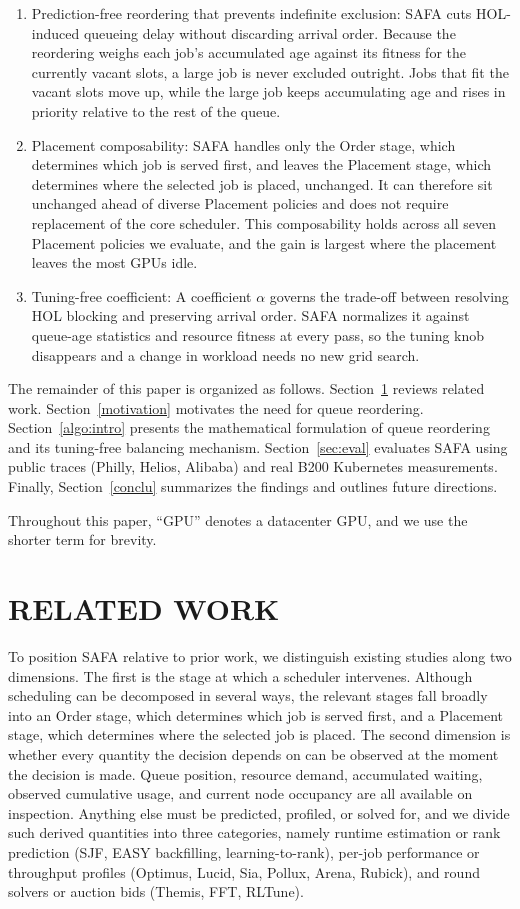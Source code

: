\documentclass{ieeetj}
\begin{document}
\begin{enumerate}
\item Prediction-free reordering that prevents indefinite exclusion: SAFA cuts HOL-induced queueing delay without discarding arrival order. Because the reordering weighs each job's accumulated age against its fitness for the currently vacant slots, a large job is never excluded outright. Jobs that fit the vacant slots move up, while the large job keeps accumulating age and rises in priority relative to the rest of the queue.
\item Placement composability: SAFA handles only the Order stage, which determines which job is served first, and leaves the Placement stage, which determines where the selected job is placed, unchanged. It can therefore sit unchanged ahead of diverse Placement policies and does not require replacement of the core scheduler. This composability holds across all seven Placement policies we evaluate, and the gain is largest where the placement leaves the most GPUs idle.
\item Tuning-free coefficient: A coefficient $\alpha$ governs the trade-off between resolving HOL blocking and preserving arrival order. SAFA normalizes it against queue-age statistics and resource fitness at every pass, so the tuning knob disappears and a change in workload needs no new grid search.
\end{enumerate}

The remainder of this paper is organized as follows. Section~\ref{Related} reviews related work. Section~\ref{motivation} motivates the need for queue reordering. Section~\ref{algo:intro} presents the mathematical formulation of queue reordering and its tuning-free balancing mechanism. Section~\ref{sec:eval} evaluates SAFA using public traces (Philly, Helios, Alibaba) and real B200 Kubernetes measurements. Finally, Section~\ref{conclu} summarizes the findings and outlines future directions.

Throughout this paper, ``GPU'' denotes a datacenter GPU, and we use the shorter term for brevity.

\section{RELATED WORK}\label{Related}
To position SAFA relative to prior work, we distinguish existing studies along two dimensions. The first is the stage at which a scheduler intervenes. Although scheduling can be decomposed in several ways, the relevant stages fall broadly into an Order stage, which determines which job is served first, and a Placement stage, which determines where the selected job is placed. The second dimension is whether every quantity the decision depends on can be observed at the moment the decision is made. Queue position, resource demand, accumulated waiting, observed cumulative usage, and current node occupancy are all available on inspection. Anything else must be predicted, profiled, or solved for, and we divide such derived quantities into three categories, namely runtime estimation or rank prediction (SJF, EASY backfilling, learning-to-rank), per-job performance or throughput profiles (Optimus, Lucid, Sia, Pollux, Arena, Rubick), and round solvers or auction bids (Themis, FFT, RLTune).
\end{document}
